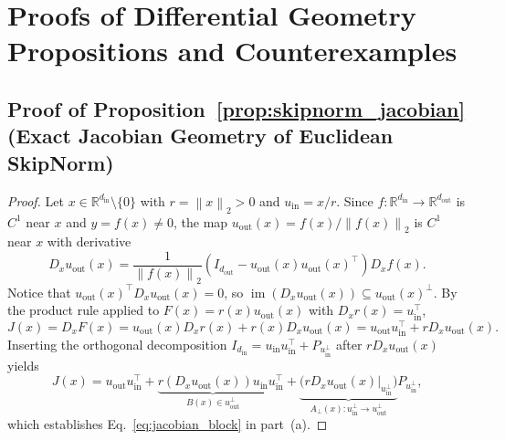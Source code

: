 \documentclass[10pt]{article}
\theoremstyle{definition}
\theoremstyle{remark}
\newcommand{\R}{\mathbb{R}}
\newcommand{\norm}[1]{\left\lVert #1 \right\rVert}
\begin{document}
\newpage
\appendix

\section{Proofs of Differential Geometry Propositions and Counterexamples}
\label{app:geometry_proofs}

\subsection{Proof of Proposition~\ref{prop:skipnorm_jacobian} (Exact Jacobian Geometry of Euclidean SkipNorm)}

\begin{proof}
Let $x \in \R^{d_{\mathrm{in}}} \setminus \{0\}$ with $r = \norm{x}_2 > 0$ and $u_{\mathrm{in}} = x / r$. Since $f: \R^{d_{\mathrm{in}}} \to \R^{d_{\mathrm{out}}}$ is $C^1$ near $x$ and $y = f(x) \neq 0$, the map $u_{\mathrm{out}}(x) = f(x) / \norm{f(x)}_2$ is $C^1$ near $x$ with derivative
\begin{equation}
    D_x u_{\mathrm{out}}(x) = \frac{1}{\norm{f(x)}_2} \left( I_{d_{\mathrm{out}}} - u_{\mathrm{out}}(x) u_{\mathrm{out}}(x)^\top \right) D_x f(x).
    \label{eq:du_out_formula}
\end{equation}
Notice that $u_{\mathrm{out}}(x)^\top D_x u_{\mathrm{out}}(x) = 0$, so $\operatorname{im}(D_x u_{\mathrm{out}}(x)) \subseteq u_{\mathrm{out}}(x)^\perp$. By the product rule applied to $F(x) = r(x) u_{\mathrm{out}}(x)$ with $D_x r(x) = u_{\mathrm{in}}^\top$,
\begin{equation}
    J(x) = D_x F(x) = u_{\mathrm{out}}(x) D_x r(x) + r(x) D_x u_{\mathrm{out}}(x) = u_{\mathrm{out}} u_{\mathrm{in}}^\top + r D_x u_{\mathrm{out}}(x).
\end{equation}
Inserting the orthogonal decomposition $I_{d_{\mathrm{in}}} = u_{\mathrm{in}} u_{\mathrm{in}}^\top + P_{u_{\mathrm{in}}^\perp}$ after $r D_x u_{\mathrm{out}}(x)$ yields
\begin{equation}
    J(x) = u_{\mathrm{out}} u_{\mathrm{in}}^\top + \underbrace{r (D_x u_{\mathrm{out}}(x)) u_{\mathrm{in}}}_{B(x) \in u_{\mathrm{out}}^\perp} u_{\mathrm{in}}^\top + \underbrace{\big(r D_x u_{\mathrm{out}}(x)\big|_{u_{\mathrm{in}}^\perp}\big)}_{A_\perp(x): u_{\mathrm{in}}^\perp \to u_{\mathrm{out}}^\perp} P_{u_{\mathrm{in}}^\perp},
\end{equation}
which establishes Eq.~\eqref{eq:jacobian_block} in part~(a).


\end{proof}
\end{document}
